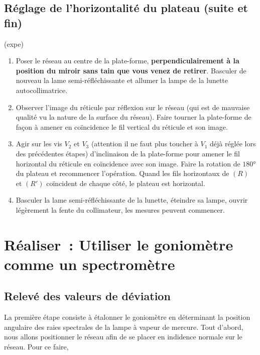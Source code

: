 \documentclass[../main/main.tex]{subfiles}
\begin{document}
\subsection{Réglage de l'horizontalité du plateau (suite et fin)}

\begin{tcb}(expe){}
  \begin{enumerate}
    \item Poser le réseau au centre de la plate-forme,
      \textbf{perpendiculairement à la position du miroir sans tain que vous
      venez de retirer}. Basculer de nouveau la lame semi-réfléchissante et
      allumer la lampe de la lunette autocollimatrice.

    \item Observer l'image du réticule par réflexion sur le réseau (qui est de
      mauvaise qualité vu la nature de la surface du réseau). Faire tourner la
      plate-forme de façon à amener en coïncidence le fil vertical du réticule
      et son image. 

    \item Agir sur les vis $V_2$ et $V_3$ (attention il ne faut plus toucher à
      $V_1$ déjà réglée lors des précédentes étapes) d'inclinaison de la
      plate-forme pour amener le fil horizontal du réticule en coïncidence avec
      son image. Faire la rotation de $\ang{180;;}$ du plateau et recommencer
      l'opération. Quand les fils horizontaux de $(R)$ et $(R')$ coïncident de
      chaque côté, le plateau est horizontal.

    \item Basculer la lame semi-réfléchissante de la lunette, éteindre sa lampe,
      ouvrir légèrement la fente du collimateur, les mesures peuvent commencer.
  \end{enumerate}
\end{tcb}

\section{Réaliser~: Utiliser le goniomètre comme un spectromètre}

\subsection{Relevé des valeurs de déviation}

La première étape consiste à étalonner le goniomètre en déterminant la position
angulaire des raies spectrales de la lampe à vapeur de mercure. Tout d'abord,
nous allons positionner le réseau afin de se placer en indidence normale sur le
réseau. Pour ce faire, 
\end{document}

